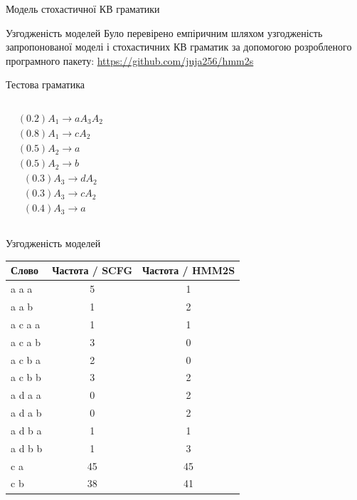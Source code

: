 \documentclass{beamer}
\begin{document}
\begin{darkframes}
\begin{frame}{Модель стохастичної КВ граматики}
    \end{frame}

    \begin{frame}{Узгодженість моделей}
      Було перевірено емпіричним шляхом узгодженість запропонованої моделі і стохастичних КВ граматик за допомогою розробленого програмного пакету: \url{https://github.com/juja256/hmm2s}
      \begin{alertblock}{Тестова граматика}
        \begin{columns}[onlytextwidth]
          \begin{align*}
            & (0.2) A_1 \rightarrow a A_3 A_2 \\
            & (0.8) A_1 \rightarrow c A_2 \\
            & (0.5) A_2 \rightarrow a \\
            & (0.5) A_2 \rightarrow b
          \end{align*}
          \begin{align*}
            & (0.3) A_3 \rightarrow d A_2 \\
            & (0.3) A_3 \rightarrow c A_2 \\
            & (0.4) A_3 \rightarrow a
          \end{align*}
        \end{columns}

      \end{alertblock}
    \end{frame}

    \begin{frame}{Узгодженість моделей}
      \begin{table}[!b]
        {\carlitoTLF %
        \begin{tabularx}{\textwidth}{Xcc}
          \textbf{Слово} & \textbf{Частота / SCFG} & \textbf{Частота / HMM2S} \\
          \toprule
          a a a & 5 & 1 \\
          a a b & 1 & 2 \\
          a c a a & 1 & 1 \\
          a c a b & 3 & 0 \\
          a c b a & 2 & 0 \\
          a c b b & 3 & 2 \\
          a d a a & 0 & 2 \\
          a d a b & 0 & 2 \\
          a d b a & 1 & 1 \\
          a d b b & 1 & 3 \\
          c a & 45 & 45 \\
          c b & 38 & 41
        \end{tabularx}}


\end{table}
\end{frame}
\end{darkframes}
\end{document}
